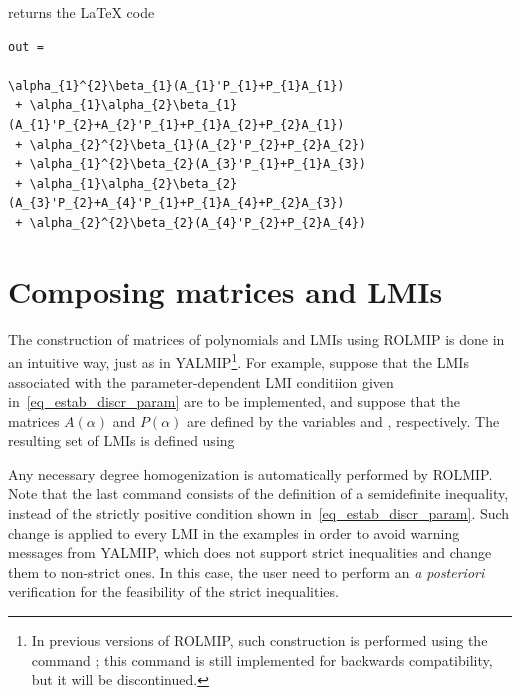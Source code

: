\documentclass[english,11pt]{article}
\theoremstyle{break} \theorembodyfont{\small\rm}
\begin{document}
\noindent returns the {\LaTeX} code


\begin{minipage}{18.2cm}
{\small
\begin{lstlisting}[rulecolor=\color{red}]
out =

\alpha_{1}^{2}\beta_{1}(A_{1}'P_{1}+P_{1}A_{1})
 + \alpha_{1}\alpha_{2}\beta_{1}(A_{1}'P_{2}+A_{2}'P_{1}+P_{1}A_{2}+P_{2}A_{1})
 + \alpha_{2}^{2}\beta_{1}(A_{2}'P_{2}+P_{2}A_{2})
 + \alpha_{1}^{2}\beta_{2}(A_{3}'P_{1}+P_{1}A_{3})
 + \alpha_{1}\alpha_{2}\beta_{2}(A_{3}'P_{2}+A_{4}'P_{1}+P_{1}A_{4}+P_{2}A_{3})
 + \alpha_{2}^{2}\beta_{2}(A_{4}'P_{2}+P_{2}A_{4})
\end{lstlisting}
}
\end{minipage}


\section{Composing matrices and LMIs}\label{construct_lmi}
The construction of matrices of polynomials and LMIs using ROLMIP is done in an intuitive way, just
as in YALMIP\footnote{In previous versions of ROLMIP, such construction is
performed using the command ; this command is still
implemented for backwards compatibility, but it will be discontinued.}. 
For example, suppose that the LMIs associated with the parameter-dependent LMI conditiion given in~\eqref{eq_estab_discr_param} are to
be implemented, and suppose that the matrices $A(\alpha)$ and $P(\alpha)$ are defined by the  variables
 and , respectively. The resulting set of LMIs is defined using

\vspace{0.5cm}%
\begin{minipage}{20.5cm}
\end{minipage}
\vspace{0.2cm}

Any necessary degree homogenization is automatically performed by ROLMIP. 
Note that the last command consists of the definition of a semidefinite inequality, instead of the 
strictly positive condition shown in~\eqref{eq_estab_discr_param}. Such change is applied to every LMI in the examples in order
to avoid warning messages from YALMIP, which does not support strict inequalities and change them
to non-strict ones. In this case, the user need to perform an \textit{a posteriori} verification 
for the feasibility of the strict inequalities.
\end{document}
